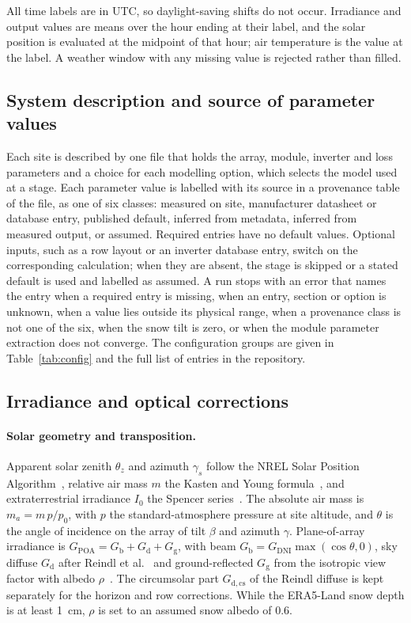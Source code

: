 \documentclass[11pt]{article}
\begin{document}
All time labels are in UTC, so daylight-saving shifts do not occur. Irradiance and output values are means over the hour ending at their label, and the solar position is evaluated at the midpoint of that hour; air temperature is the value at the label. A weather window with any missing value is rejected rather than filled.

\subsection{System description and source of parameter values}
\label{sec:config}

Each site is described by one file that holds the array, module, inverter and loss parameters and a choice for each modelling option, which selects the model used at a stage. Each parameter value is labelled with its source in a provenance table of the file, as one of six classes: measured on site, manufacturer datasheet or database entry, published default, inferred from metadata, inferred from measured output, or assumed. Required entries have no default values. Optional inputs, such as a row layout or an inverter database entry, switch on the corresponding calculation; when they are absent, the stage is skipped or a stated default is used and labelled as assumed. A run stops with an error that names the entry when a required entry is missing, when an entry, section or option is unknown, when a value lies outside its physical range, when a provenance class is not one of the six, when the snow tilt is zero, or when the module parameter extraction does not converge. The configuration groups are given in Table~\ref{tab:config} and the full list of entries in the repository.

\subsection{Irradiance and optical corrections}
\label{sec:irr}

\paragraph{Solar geometry and transposition.}
Apparent solar zenith $\theta_z$ and azimuth $\gamma_s$ follow the NREL Solar Position Algorithm~\cite{reda2004spa}, relative air mass $m$ the Kasten and Young formula~\cite{kasten1989airmass}, and extraterrestrial irradiance $I_0$ the Spencer series~\cite{spencer1971fourier}. The absolute air mass is $m_a=m\,p/p_0$, with $p$ the standard-atmosphere pressure at site altitude, and $\theta$ is the angle of incidence on the array of tilt $\beta$ and azimuth $\gamma$. Plane-of-array irradiance is $G_{\mathrm{POA}}=G_{\mathrm{b}}+G_{\mathrm{d}}+G_{\mathrm{g}}$, with beam $G_{\mathrm{b}}=G_{\mathrm{DNI}}\max(\cos\theta,0)$, sky diffuse $G_{\mathrm{d}}$ after Reindl et al.~\cite{reindlEvaluationHourly1990} and ground-reflected $G_{\mathrm{g}}$ from the isotropic view factor with albedo $\rho$~\cite{liuJordan1961}. The circumsolar part $G_{\mathrm{d,cs}}$ of the Reindl diffuse is kept separately for the horizon and row corrections. While the ERA5-Land snow depth is at least 1~cm, $\rho$ is set to an assumed snow albedo of 0.6.
\end{document}
